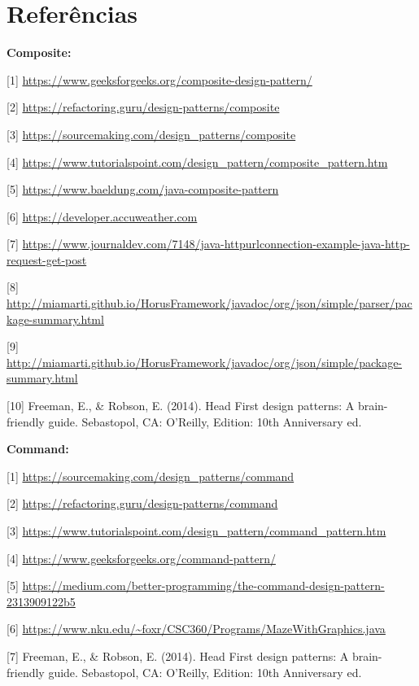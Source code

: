 \documentclass[10pt,portuguese]{article}
\begin{document}
\clearpage

\section{Referências}





\vspace{5mm} %

\par \textbf{Composite:}

[1] \url{https://www.geeksforgeeks.org/composite-design-pattern/}

[2] \url{https://refactoring.guru/design-patterns/composite}

[3] \url{https://sourcemaking.com/design_patterns/composite}

[4] \url{https://www.tutorialspoint.com/design_pattern/composite_pattern.htm}

[5] \url{https://www.baeldung.com/java-composite-pattern}

[6] \url{https://developer.accuweather.com}

[7] \url{https://www.journaldev.com/7148/java-httpurlconnection-example-java-http-request-get-post}

[8] \url{http://miamarti.github.io/HorusFramework/javadoc/org/json/simple/parser/package-summary.html}

[9] \url{http://miamarti.github.io/HorusFramework/javadoc/org/json/simple/package-summary.html}

[10] Freeman, E., \& Robson, E. (2014). Head First design patterns: A brain-friendly guide. Sebastopol, CA: O'Reilly, Edition: 10th Anniversary ed.


\par \textbf{Command:}

[1] \url{https://sourcemaking.com/design_patterns/command}

[2] \url{https://refactoring.guru/design-patterns/command}

[3] \url{https://www.tutorialspoint.com/design_pattern/command_pattern.htm}

[4] \url{https://www.geeksforgeeks.org/command-pattern/}

[5] \url{https://medium.com/better-programming/the-command-design-pattern-2313909122b5}

[6] \url{https://www.nku.edu/~foxr/CSC360/Programs/MazeWithGraphics.java}

[7] Freeman, E., \& Robson, E. (2014). Head First design patterns: A brain-friendly guide. Sebastopol, CA: O'Reilly, Edition: 10th Anniversary ed.
\end{document}
